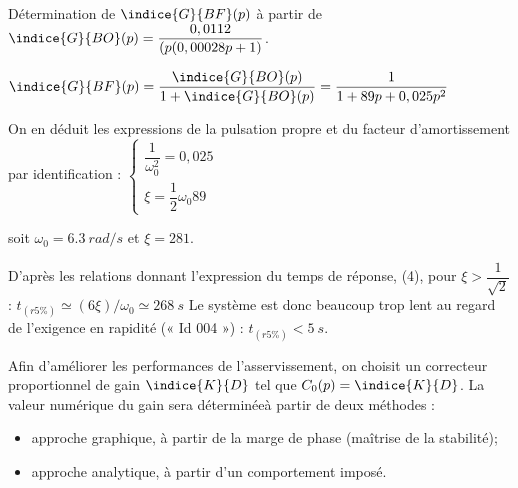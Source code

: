 \ifprof
\begin{corrige}%
Détermination de $\indice{G}{BF} (p)$ à partir de $\indice{G}{BO} (p)=\dfrac{0,0112}{(p(0,00028p+1)} $.

$\indice{G}{BF} (p) = \dfrac{\indice{G}{BO} (p)}{1+\indice{G}{BO} (p)} = \dfrac{1}{1+89 p + 0,025 p^2}$


On en déduit les expressions de la pulsation propre et du facteur d’amortissement par identification :
$
\left\{
\begin{array}{l}
\dfrac{1}{\omega_0^2} = 0,025 \\
\xi = \dfrac{1}{2}\omega_0 89
\end{array}
\right.$

 soit $\omega_0 = \SI{6,3}{rad/s}$ et $\xi =281$.
 
D’après les relations donnant l’expression du temps de réponse, (4), pour $\xi >\dfrac{1}{\sqrt{2}}$ : $t_(r5\%)\simeq(6 \xi)/\omega_0 \simeq \SI{268}{s}$
Le système est donc beaucoup trop lent au regard de l’exigence en rapidité (« Id 004 ») : 
$t_(r5\%)<\SI{5}{s}$.

\end{corrige}
\else
\fi
\ifprof
\else
Afin d’améliorer les performances de l’asservissement, on choisit un correcteur proportionnel de gain 
$\indice{K}{D}$ tel que $C_0(p) = \indice{K}{D}$. La valeur numérique du gain sera déterminéeà partir de deux méthodes :
\begin{itemize}
\item approche graphique, à partir de la marge de phase (maîtrise de la stabilité);
\item approche analytique, à partir d’un comportement imposé.
\end{itemize}
\fi

